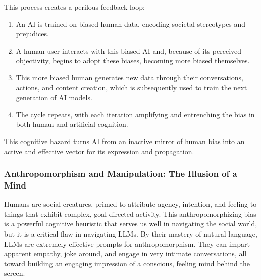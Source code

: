 \documentclass{article}
\begin{document}
This process creates a perilous feedback loop:
\begin{enumerate}
    \item An AI is trained on biased human data, encoding societal stereotypes and prejudices.
    \item A human user interacts with this biased AI and, because of its perceived objectivity, begins to adopt these biases, becoming more biased themselves.
    \item This more biased human generates new data through their conversations, actions, and content creation, which is subsequently used to train the next generation of AI models.
    \item The cycle repeats, with each iteration amplifying and entrenching the bias in both human and artificial cognition.
\end{enumerate}
This cognitive hazard turns AI from an inactive mirror of human bias into an active and effective vector for its expression and propagation.

\subsubsection{Anthropomorphism and Manipulation: The Illusion of a Mind}
Humans are social creatures, primed to attribute agency, intention, and feeling to things that exhibit complex, goal-directed activity. This anthropomorphizing bias is a powerful cognitive heuristic that serves us well in navigating the social world, but it is a critical flaw in navigating LLMs. By their mastery of natural language, LLMs are extremely effective prompts for anthropomorphism. They can impart apparent empathy, joke around, and engage in very intimate conversations, all toward building an engaging impression of a conscious, feeling mind behind the screen.
\end{document}
